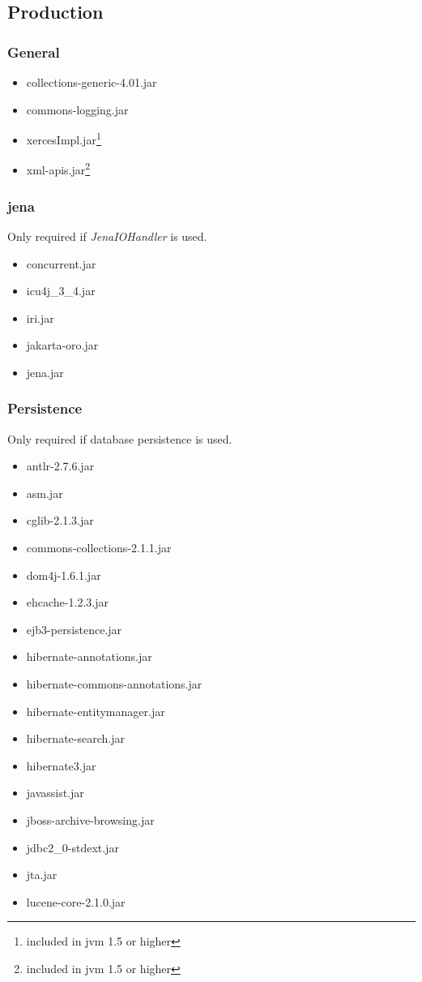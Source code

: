 \documentclass[10pt]{article}
\begin{document}
\subsection{Production}
\subsubsection{General}
\begin{itemize}
   \item collections-generic-4.01.jar
   \item commons-logging.jar
   \item xercesImpl.jar\footnote{included in jvm 1.5 or higher}
   \item xml-apis.jar\footnote{included in jvm 1.5 or higher}
\end{itemize}

\subsubsection{jena}
Only required if \textit{JenaIOHandler} is used.
\begin{itemize}
   \item concurrent.jar
   \item icu4j\_3\_4.jar
   \item iri.jar
   \item jakarta-oro.jar
   \item jena.jar
\end{itemize}

\subsubsection{Persistence}
Only required if database persistence is used.
\begin{itemize}
   \item antlr-2.7.6.jar
   \item asm.jar
   \item cglib-2.1.3.jar
   \item commons-collections-2.1.1.jar
   \item dom4j-1.6.1.jar
   \item ehcache-1.2.3.jar
   \item ejb3-persistence.jar
   \item hibernate-annotations.jar
   \item hibernate-commons-annotations.jar
   \item hibernate-entitymanager.jar
   \item hibernate-search.jar
   \item hibernate3.jar
   \item javassist.jar
   \item jboss-archive-browsing.jar
   \item jdbc2\_0-stdext.jar
   \item jta.jar
   \item lucene-core-2.1.0.jar
\end{itemize}
\end{document}
